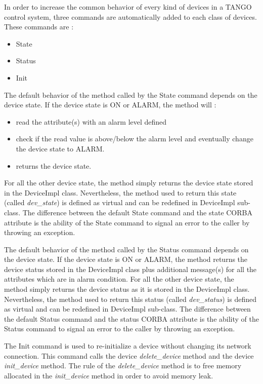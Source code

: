 In order to increase the common behavior of every kind of devices
in a TANGO control system, three commands are automatically added
to each class of devices. These commands are :
\begin{itemize}
\item State
\item Status
\item Init
\end{itemize}
The default behavior of the method called by the State command depends
on the device state. If the device state is ON or ALARM,
the method will :
\begin{itemize}
\item read the attribute(s) with an alarm level defined
\item check if the read value is above/below the alarm level and eventually
change the device state to ALARM.
\item returns the device state.
\end{itemize}
For all the other device state, the method simply returns
the device state stored in the DeviceImpl class. Nevertheless, the
method used to return this state (called \emph{dev\_state})
is defined as virtual and can be redefined in DeviceImpl sub-class.
The difference between the default State command and the state CORBA
attribute is the ability of the State command to signal
an error to the caller by throwing an exception.

The default behavior of the method called by the Status
command depends on the device state. If the device state is ON or
ALARM, the method returns the device status stored in
the DeviceImpl class plus additional message(s) for all the attributes
which are in alarm condition. For all the other device state, the
method simply returns the device status as it is stored in the DeviceImpl
class. Nevertheless, the method used to return this status (called
\emph{dev\_status}) is defined as virtual and can be
redefined in DeviceImpl sub-class. The difference between the default
Status command and the status CORBA attribute is the ability of the
Status command to signal an error to the caller by throwing an exception.

The Init command is used to re-initialize a device without
changing its network connection. This command calls the device \emph{delete\_device}
method and the device \emph{init\_device} method.
The rule of the \emph{delete\_device} method is to free memory allocated
in the \emph{init\_device} method in order to avoid memory leak.


